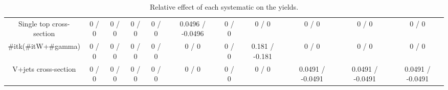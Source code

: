 \begin{table}[htbp]
\begin{center}
\begin{tabular}{|c|c|c|c|c|c|c|c|c|c|c|}
  Single top cross-section & 0 / 0 & 0 / 0 & 0 / 0 & 0 / 0 & 0.0496 / -0.0496 & 0 / 0 & 0 / 0 & 0 / 0 & 0 / 0 & 0 / 0 \\ 
  #it{k}(#it{W+#gamma}) & 0 / 0 & 0 / 0 & 0 / 0 & 0 / 0 & 0 / 0 & 0 / 0 & 0.181 / -0.181 & 0 / 0 & 0 / 0 & 0 / 0 \\ 
  V+jets cross-section & 0 / 0 & 0 / 0 & 0 / 0 & 0 / 0 & 0 / 0 & 0 / 0 & 0 / 0 & 0.0491 / -0.0491 & 0.0491 / -0.0491 & 0.0491 / -0.0491 \\ 
\hline 
\end{tabular} 
\caption{Relative effect of each systematic on the yields.} 
\end{center} 
\end{table} 
